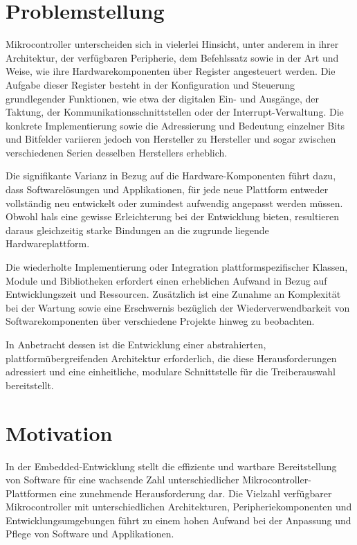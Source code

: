\section{Problemstellung}
Mikrocontroller unterscheiden sich in vielerlei Hinsicht, unter anderem in ihrer Architektur, der verfügbaren Peripherie, dem Befehlssatz sowie in der Art und Weise, wie ihre Hardwarekomponenten über Register angesteuert werden.
Die Aufgabe dieser Register besteht in der Konfiguration und Steuerung grundlegender Funktionen, wie etwa der digitalen Ein- und Ausgänge, der Taktung, der Kommunikationsschnittstellen oder der Interrupt-Verwaltung.
Die konkrete Implementierung sowie die Adressierung und Bedeutung einzelner Bits und Bitfelder variieren jedoch von Hersteller zu Hersteller und sogar zwischen verschiedenen Serien desselben Herstellers erheblich.

Die signifikante Varianz in Bezug auf die Hardware-Komponenten führt dazu, dass Softwarelösungen und Applikationen, für jede neue Plattform entweder vollständig neu entwickelt oder zumindest aufwendig angepasst werden müssen.
Obwohl \gls{hals} eine gewisse Erleichterung bei der Entwicklung bieten, resultieren daraus gleichzeitig starke Bindungen an die zugrunde liegende Hardwareplattform.

Die wiederholte Implementierung oder Integration plattformspezifischer Klassen, Module und Bibliotheken erfordert einen erheblichen Aufwand in Bezug auf Entwicklungszeit und Ressourcen.
Zusätzlich ist eine Zunahme an Komplexität bei der Wartung sowie eine Erschwernis bezüglich der Wiederverwendbarkeit von Softwarekomponenten über verschiedene Projekte hinweg zu beobachten.

 In Anbetracht dessen ist die Entwicklung einer abstrahierten, plattformübergreifenden Architektur erforderlich, die diese Herausforderungen adressiert und eine einheitliche, modulare Schnittstelle für die Treiberauswahl bereitstellt.



\section{Motivation}
In der Embedded-Entwicklung stellt die effiziente und wartbare Bereitstellung von Software für eine wachsende Zahl unterschiedlicher Mikrocontroller-Plattformen eine zunehmende Herausforderung dar.
Die Vielzahl verfügbarer Mikrocontroller mit unterschiedlichen Architekturen, Peripheriekomponenten und Entwicklungsumgebungen führt zu einem hohen Aufwand bei der Anpassung und Pflege von Software und Applikationen.



